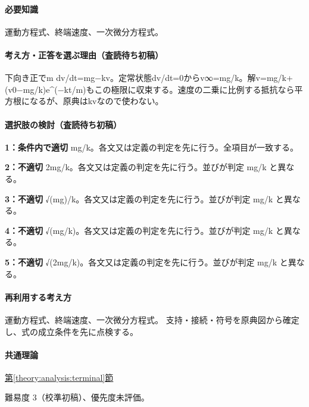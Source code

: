 \paragraph{必要知識} 運動方程式、終端速度、一次微分方程式。

\paragraph{考え方・正答を選ぶ理由（査読待ち初稿）} 下向き正でm dv/dt=\allowbreak{}mg−kv。定常状態dv/dt=\allowbreak{}0からv∞=mg/k。解v=\allowbreak{}mg/k+(v0−mg/k)e\textasciicircum{}(−kt/m)もこの極限に収束する。速度の二乗に比例する抵抗なら平方根になるが、原典はkvなので使わない。

\paragraph{選択肢の検討（査読待ち初稿）}\mbox{}\par

\noindent\textbf{1：条件内で適切} mg/k。各文又は定義の判定を先に行う。全項目が一致する。\par

\noindent\textbf{2：不適切} 2mg/k。各文又は定義の判定を先に行う。並びが判定 mg/k と異なる。\par

\noindent\textbf{3：不適切} √(mg)/k。各文又は定義の判定を先に行う。並びが判定 mg/k と異なる。\par

\noindent\textbf{4：不適切} √(mg/k)。各文又は定義の判定を先に行う。並びが判定 mg/k と異なる。\par

\noindent\textbf{5：不適切} √(2mg/k)。各文又は定義の判定を先に行う。並びが判定 mg/k と異なる。\par

\paragraph{再利用する考え方} 運動方程式、終端速度、一次微分方程式。 支持・接続・符号を原典図から確定し、式の成立条件を先に点検する。

\paragraph{共通理論} \hyperref[theory:analysis:terminal]{第\ref*{theory:analysis:terminal}節}

\par 難易度 3（校準初稿）、優先度未評価。

